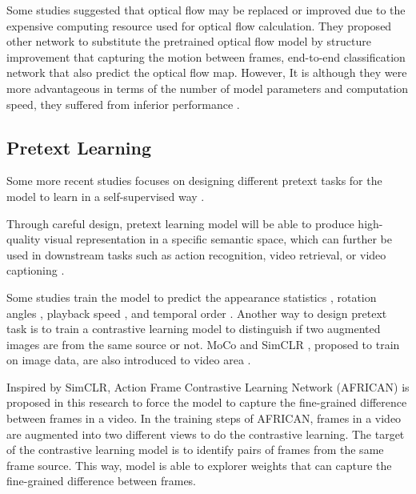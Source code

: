 Some studies suggested that optical flow may be replaced or improved due to the expensive computing resource used for optical flow calculation. They proposed other network to substitute the pretrained optical flow model by structure improvement that capturing the motion between frames, end-to-end classification network that also predict the optical flow map. However, It is although they were more advantageous in terms of the number of model parameters and computation speed, they suffered from inferior performance \parencite{Lee_2018_ECCV, 8354283, Piergiovanni_2019_CVPR}.

\subsection{Pretext Learning}
Some more recent studies focuses on designing different pretext tasks for the model to learn in a self-supervised way \parencite{wang2022internvideo}.

Through careful design, pretext learning model will be able to produce high-quality visual representation in a specific semantic space, which can further be used in downstream tasks such as action recognition, video retrieval, or video captioning \parencite{10.1145/3577925}.

Some studies train the model to predict the appearance statistics \parencite{Wang_2019_CVPR}, rotation angles \parencite{DBLP:journals/corr/abs-1811-11387}, playback speed \parencite{Yao_2020_CVPR, 10.1007/978-3-030-58520-4_30}, and temporal order \parencite{10.1007/978-3-030-58604-1_26}. Another way to design pretext task is to train a contrastive learning model to distinguish if two augmented images are from the same source or not. MoCo \parencite{finn2017model} and SimCLR \parencite{pmlr-v119-chen20j}, proposed to train on image data, are also introduced to video area \parencite{Feichtenhofer_2021_CVPR}.

Inspired by SimCLR, Action Frame Contrastive Learning Network (AFRICAN) is proposed in this research to force the model to capture the fine-grained difference between frames in a video. In the training steps of AFRICAN, frames in a video are augmented into two different views to do the contrastive learning. The target of the contrastive learning model is to identify pairs of frames from the same frame source. This way, model is able to explorer weights that can capture the fine-grained difference between frames. 

